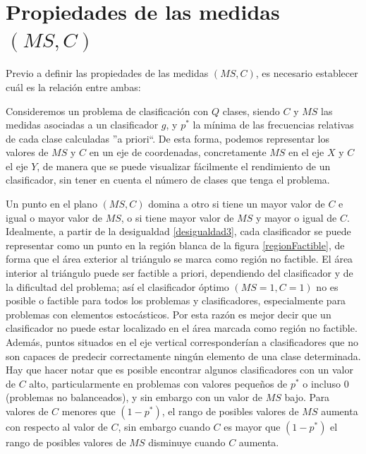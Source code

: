 \section{Propiedades de las medidas $(MS,C)$}\label{propiedades}
Previo a definir las propiedades de las medidas $(MS,C)$, es necesario establecer cuál
es la relación entre ambas:

Consideremos un problema de clasificación con $Q$ clases, siendo $C$ y $MS$ las
medidas asociadas a un clasificador $g$, y $p^*$ la mínima de las frecuencias relativas
de cada clase calculadas ''a priori``. De esta forma, podemos representar los valores
de $MS$ y $C$ en un eje de coordenadas, concretamente $MS$ en el eje $X$ y $C$ el eje $Y$,
de manera que se puede visualizar fácilmente el rendimiento de un clasificador, sin tener
en cuenta el número de clases	que tenga el problema.

Un punto en el plano $\left(MS,C\right)$ domina a otro si tiene un mayor valor de $C$ e
igual o mayor valor de $MS$, o si tiene mayor valor de $MS$ y mayor o igual de $C$.
Idealmente, a partir de la desigualdad \ref{desigualdad3}, cada clasificador se puede
representar como
un punto en la región blanca de la figura \ref{regionFactible}, de forma que el área
exterior al triángulo se marca como región no factible. El área interior al triángulo
puede ser factible a priori, dependiendo del clasificador y de la dificultad del problema;
así el clasificador óptimo $\left(MS=1,C=1\right)$ no es posible o factible para todos los
problemas y clasificadores, especialmente para problemas con elementos estocásticos. Por
esta razón es mejor decir que un clasificador no puede estar localizado en el área
marcada como región no factible. Además, puntos situados en el eje vertical
corresponderían a clasificadores que no son capaces de predecir correctamente ningún
elemento de una clase determinada. Hay que hacer notar que es posible encontrar algunos
clasificadores con un valor de $C$ alto, particularmente en problemas con valores pequeños
de $p^*$ o incluso $0$ (problemas no balanceados), y sin embargo con un valor de $MS$
bajo. Para valores de $C$ menores que $(1-p^*)$, el rango de posibles valores de $MS$
aumenta con respecto al valor de $C$, sin embargo cuando $C$ es mayor que $(1-p^*)$ el
rango de posibles valores de $MS$ disminuye cuando $C$ aumenta.

